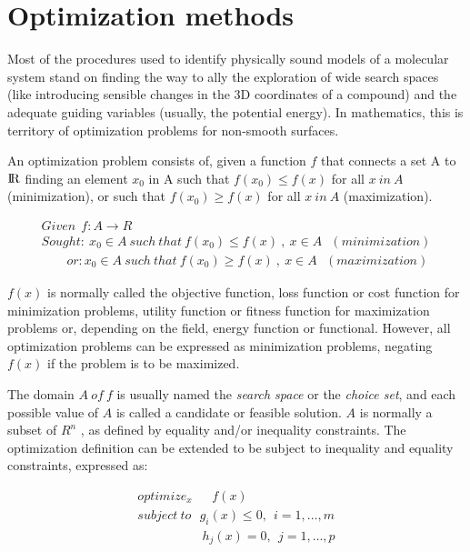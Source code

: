 \section{Optimization methods}

Most of the procedures used to identify physically sound models of a molecular system stand on finding the way to ally the exploration of wide search spaces (like introducing sensible changes in the 3D coordinates of a compound) and the adequate guiding variables (usually, the potential energy). In mathematics, this is territory of optimization problems for non-smooth surfaces.

An optimization problem consists of, given a function $ f $ that connects a set A to ${\rm I\!R}$ finding an element $ x_{0} $ in A such that $ f(x_{0}) \leq f(x) $ for all $ x~in~A $  (minimization), or such that $ f(x_{0}) \geq f(x) $ for all $ x~in~A $ (maximization).

\begin{align}
	Given ~~ f:A \rightarrow R \nonumber \\
	Sought: ~ x_{0} \in A ~ such ~ that ~ f(x_{0})  \leq f(x) ~,~x \in A ~~~ ( minimization ) \nonumber \\
	~~~~~~~~~ or: x_{0} \in A ~ such ~ that ~ f(x_{0})  \geq f(x) ~,~x \in A ~~~ ( maximization )
\end{align}

$ f(x) $  is normally called the objective function, loss function or cost function for minimization problems, utility function or fitness function for maximization problems or, depending on the field, energy function or functional. However, all optimization problems can be expressed as minimization problems, negating  $ f(x) $  if the problem is to be maximized.

The domain  $ A ~ of ~ f $ is usually named the \textit{search space} or the \textit{choice set}, and each possible value of  $ A $  is called a candidate or feasible solution.  $ A $  is normally a subset of  $ R^{n} $ , as defined by equality and/or inequality constraints. The optimization definition can be extended to be subject to inequality and equality constraints, expressed as:

\begin{align}
	optimize_{x}~~~~~~~ f(x) \nonumber \\
	subject~to~~~  g_{i}(x)  \leq 0,~~ i=1,  \ldots ,m \nonumber \\
	~~~~~~~~~~~~~~~~~~~~~~~ h_{j}(x) =0,~~ j=1,  \ldots ,p
\end{align}

